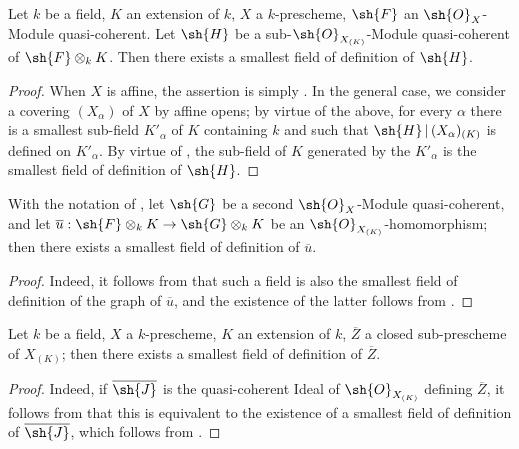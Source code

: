 \begin{proposition}[4.8.9]
\label{IV.4.8.9}
Let $k$ be a field, $K$ an extension of $k$, $X$ a $k$-prescheme, $\sh{F}$ an $\sh{O}_X$-Module quasi-coherent.
Let $\sh{H}$ be a sub-$\sh{O}_{X_{(K)}}$-Module quasi-coherent of $\sh{F}\otimes_k K$.
Then there exists a smallest field of definition of $\sh{H}$.
\end{proposition}

\begin{proof}
When $X$ is affine, the assertion is simply .
In the general case, we consider a covering $(X_\alpha)$ of $X$ by affine opens; by virtue of the above, for every $\alpha$ there is a smallest sub-field $K'_\alpha$ of $K$ containing $k$ and such that $\sh{H}\,|\,(X_\alpha)_{(K)}$ is defined on $K'_\alpha$.
By virtue of , the sub-field of $K$ generated by the $K'_\alpha$ is the smallest field of definition of $\sh{H}$.
\end{proof}

\begin{corollary}[4.8.10]
\label{IV.4.8.10}
With the notation of , let $\sh{G}$ be a second $\sh{O}_X$-Module quasi-coherent, and let $\overline{u}:\sh{F}\otimes_k K\to\sh{G}\otimes_k K$ be an $\sh{O}_{X_{(K)}}$-homomorphism; then there exists a smallest field of definition of $\overline{u}$.
\end{corollary}

\begin{proof}
Indeed, it follows from  that such a field is also the smallest field of definition of the graph of $\overline{u}$, and the existence of the latter follows from .
\end{proof}

\begin{corollary}[4.8.11]
\label{IV.4.8.11}
Let $k$ be a field, $X$ a $k$-prescheme, $K$ an extension of $k$, $\overline{Z}$ a closed sub-prescheme of $X_{(K)}$; then there exists a smallest field of definition of $\overline{Z}$.
\end{corollary}

\begin{proof}
Indeed, if $\overline{\sh{J}}$ is the quasi-coherent Ideal of $\sh{O}_{X_{(K)}}$ defining $\overline{Z}$, it follows from  that this is equivalent to the existence of a smallest field of definition of $\overline{\sh{J}}$, which follows from .
\end{proof}

